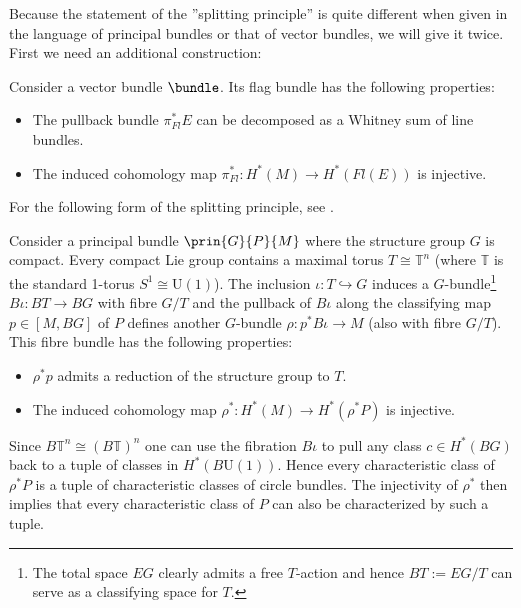     Because the statement of the ''splitting principle'' is quite different when given in the language of principal bundles or that of vector bundles, we will give it twice. First we need an additional construction:
    \begin{theorem}
        Consider a vector bundle $\bundle$. Its flag bundle has the following properties:
        \begin{itemize}
            \item The pullback bundle $\pi_{Fl}^*E$ can be decomposed as a Whitney sum of line bundles.
            \item The induced cohomology map $\pi_{Fl}^*:H^*(M)\rightarrow H^*(Fl(E))$ is injective.
        \end{itemize}
    \end{theorem}
    For the following form of the splitting principle, see \cite{may_splitting, debray_characteristic}.
    \begin{theorem}
        Consider a principal bundle $\prin{G}{P}{M}$ where the structure group $G$ is compact. Every compact Lie group contains a maximal torus $T\cong\mathbb{T}^n$ (where $\mathbb{T}$ is the standard 1-torus $S^1\cong\text{U}(1)$). The inclusion $\iota:T\hookrightarrow G$ induces a $G$-bundle\footnote{The total space $EG$ clearly admits a free $T$-action and hence $BT:=EG/T$ can serve as a classifying space for $T$.} $B\iota:BT\rightarrow BG$ with fibre $G/T$ and the pullback of $B\iota$ along the classifying map $p\in[M, BG]$ of $P$ defines another $G$-bundle $\rho:p^*B\iota\rightarrow M$ (also with fibre $G/T$). This fibre bundle has the following properties:
        \begin{itemize}
            \item $\rho^*p$ admits a reduction of the structure group to $T$.
            \item The induced cohomology map $\rho^*:H^*(M)\rightarrow H^*(\rho^*P)$ is injective.
        \end{itemize}
    \end{theorem}
    Since $B\mathbb{T}^n\cong(B\mathbb{T})^n$ one can use the fibration $B\iota$ to pull any class $c\in H^*(BG)$ back to a tuple of classes in $H^*(B\text{U}(1))$. Hence every characteristic class of $\rho^*P$ is a tuple of characteristic classes of circle bundles. The injectivity of $\rho^*$ then implies that every characteristic class of $P$ can also be characterized by such a tuple.

